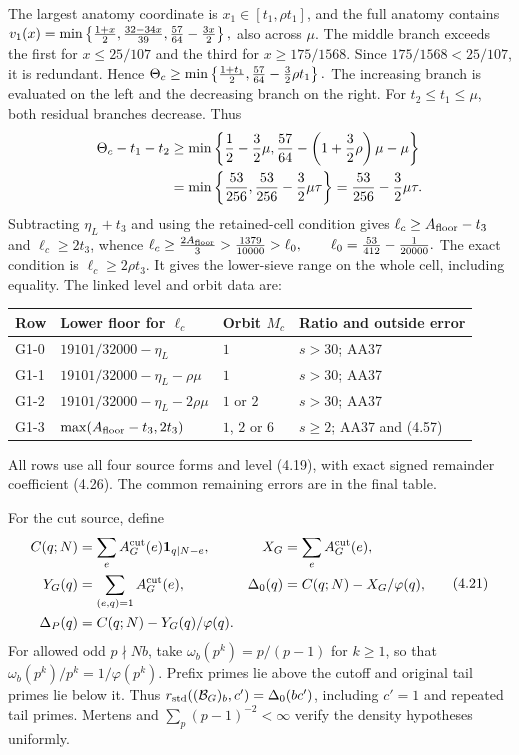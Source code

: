 The largest anatomy coordinate is $x_1\in[t_1,\rho t_1]$, and the full anatomy contains
$v_1(x)=\min\left\{{1+x\over2},{32-34x\over39},
                         {57\over64}-{3x\over2}\right\},$
also across $\mu$.
The middle branch exceeds the first for $x\le25/107$ and the third for $x\ge175/1568$.
Since $175/1568<25/107$, it is redundant.
Hence
$\Theta_c\ge\min\left\{{1+t_1\over2},
                    {57\over64}-{3\over2}\rho t_1\right\}.$
The increasing branch is evaluated on the left and the decreasing branch on the right.
For $t_2\le t_1\le\mu$, both residual branches decrease.
Thus
\[
 \begin{aligned}
 \Theta_c-t_1-t_2
 &\ge\min\left\{{1\over2}-{3\over2}\mu,
                {57\over64}-\left(1+{3\over2}\rho\right)\mu-\mu\right\}\\
 &=\min\left\{{53\over256},
              {53\over256}-{3\over2}\mu\tau\right\}
 ={53\over256}-{3\over2}\mu\tau.
 \end{aligned}
\]
Subtracting $\eta_L+t_3$ and using the retained-cell condition gives $\ell_c\ge A_{\rm floor}-t_3$ and $\ell_c\ge2t_3$, whence
$\ell_c\ge{2A_{\rm floor}\over3}>{1379\over10000}>\ell_0,
 \qquad \ell_0={53\over412}-{1\over20000}.$
The exact condition is $\ell_c\ge2\rho t_3$.
It gives the lower-sieve range on the whole cell, including equality.
The linked level and orbit data are:
\begin{center}
\begin{tabular}{@{}lllp{}@{}}
\toprule
Row & Lower floor for $\ell_c$ & Orbit $M_c$ & Ratio and outside error \\
\midrule
G1-0 & $19101/32000-\eta_L$ & $1$ & $s>30$; AA37 \\
G1-1 & $19101/32000-\eta_L-\rho\mu$ & $1$ & $s>30$; AA37 \\
G1-2 & $19101/32000-\eta_L-2\rho\mu$ & $1$ or $2$ & $s>30$; AA37 \\
G1-3 & $\max(A_{\rm floor}-t_3,2t_3)$ & $1$, $2$ or $6$ & $s\ge2$; AA37 and (4.57) \\
\bottomrule
\end{tabular}
\end{center}
All rows use all four source forms and level (4.19),
with exact signed remainder coefficient (4.26).
The common remaining errors are in the final table.


For the cut source, define
\[
\begin{aligned}
 C(q;N)&=\sum_eA_G^{\rm cut}(e)\mathbf1_{q\mid N-e},&
 X_G&=\sum_eA_G^{\rm cut}(e),\\
 Y_G(q)&=\sum_{(e,q)=1}A_G^{\rm cut}(e),&
 \Delta_0(q)&=C(q;N)-X_G/\varphi(q),\\
 \Delta_P(q)&=C(q;N)-Y_G(q)/\varphi(q).&&
\end{aligned}
 \tag{4.21}
\]
For allowed odd $p\nmid Nb$, take $\omega_b(p^k)=p/(p-1)$ for $k\ge1$,
so that $\omega_b(p^k)/p^k=1/\varphi(p^k)$.
Prefix primes lie above the cutoff and original tail primes lie below it.
Thus $r_{\rm std}((\mathcal B_G)_b,c')=\Delta_0(bc')$, including $c'=1$ and repeated tail primes.
Mertens and $\sum_p(p-1)^{-2}<\infty$ verify the density hypotheses uniformly.

